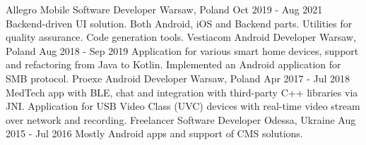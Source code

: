 \begin{cvsection}[Experience]
  \cvexperience
    {Allegro}
    {Mobile Software Developer}
    {Warsaw, Poland}
    {Oct 2019 - Aug 2021}
    {
      Backend-driven UI solution. Both Android, iOS and Backend parts.
      \newline
      Utilities for quality assurance. Code generation tools.
    }
  \cvexperience
    {Vestiacom}
    {Android Developer}
    {Warsaw, Poland}
    {Aug 2018 - Sep 2019}
    {
      Application for various smart home devices, support and refactoring from Java to Kotlin.
      \newline
      Implemented an Android application for SMB protocol.
    }
  \cvexperience
    {Proexe}
    {Android Developer}
    {Warsaw, Poland}
    {Apr 2017 - Jul 2018}
    {
      MedTech app with BLE, chat and integration with third-party C++ libraries via JNI.
      \newline
      Application for USB Video Class (UVC) devices with real-time video stream over network and recording.
    }
  \cvexperience
    {Freelancer}
    {Software Developer}
    {Odessa, Ukraine}
    {Aug 2015 - Jul 2016}
    {
      Mostly Android apps and support of CMS solutions.
    }
\end{cvsection}
